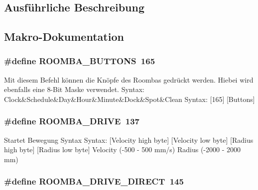 \subsection{Ausführliche Beschreibung}


\subsection{Makro-\/\-Dokumentation}
\hypertarget{group__roomba__commands__motor_ga57cbce423408ed2ed3595f504ec300cb}{
\subsubsection[{R\-O\-O\-M\-B\-A\-\_\-\-B\-U\-T\-T\-O\-N\-S}]{\setlength{\rightskip}{0pt plus 5cm}\#define R\-O\-O\-M\-B\-A\-\_\-\-B\-U\-T\-T\-O\-N\-S~165}}\label{group__roomba__commands__motor_ga57cbce423408ed2ed3595f504ec300cb}
Mit diesem Befehl können die Knöpfe des Roombas gedrückt werden. Hiebei wird ebenfalls eine 8-\/\-Bit Maske verwendet. Syntax\-: Clock\&Schedule\&Day\&Hour\&Minute\&Dock\&Spot\&Clean Syntax\-: \mbox{[}165\mbox{]} \mbox{[}Buttons\mbox{]} \hypertarget{group__roomba__commands__motor_gacf921626edb00b06fbdf86312d8c7341}{
\subsubsection[{R\-O\-O\-M\-B\-A\-\_\-\-D\-R\-I\-V\-E}]{\setlength{\rightskip}{0pt plus 5cm}\#define R\-O\-O\-M\-B\-A\-\_\-\-D\-R\-I\-V\-E~137}}\label{group__roomba__commands__motor_gacf921626edb00b06fbdf86312d8c7341}
Startet Bewegung Syntax Syntax\-: \mbox{[}Velocity high byte\mbox{]} \mbox{[}Velocity low byte\mbox{]} \mbox{[}Radius high byte\mbox{]} \mbox{[}Radius low byte\mbox{]} Velocity (-\/500 -\/ 500 mm/s) Radius (-\/2000 -\/ 2000 mm) \hypertarget{group__roomba__commands__motor_ga26e08e4c9584dfc518700fd299eddc96}{
\subsubsection[{R\-O\-O\-M\-B\-A\-\_\-\-D\-R\-I\-V\-E\-\_\-\-D\-I\-R\-E\-C\-T}]{\setlength{\rightskip}{0pt plus 5cm}\#define R\-O\-O\-M\-B\-A\-\_\-\-D\-R\-I\-V\-E\-\_\-\-D\-I\-R\-E\-C\-T~145}}\label{group__roomba__commands__motor_ga26e08e4c9584dfc518700fd299eddc96}
